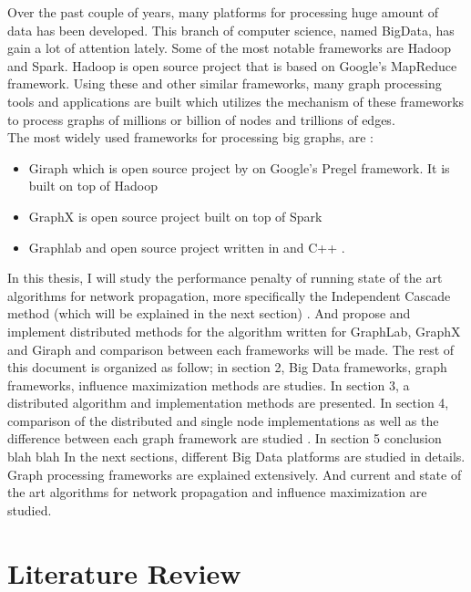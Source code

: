 \documentclass[english]{tktltiki}
\begin{document}
Over the past couple of years, many platforms for processing huge amount of data has been developed. This branch of computer science, named BigData, has gain a lot of attention lately. Some of the most notable frameworks are Hadoop and Spark. Hadoop is open source project that is based on Google's MapReduce framework. 
Using these and other similar frameworks, many graph processing tools and applications are built which utilizes the mechanism of these frameworks to process graphs of millions or billion of nodes and trillions of edges. \\
The most widely used frameworks for processing big graphs, are :
\begin{itemize}
\item 
Giraph which is open source project by on Google's Pregel framework. It is built on top of Hadoop
\item 
GraphX is open source project built on top of Spark
\item
Graphlab and open source project written in  and C++ . 
\end{itemize}
In this thesis, I will study the performance penalty of running state of the art algorithms for network propagation, more specifically the Independent Cascade method (which will be explained in the next section) . And propose and implement distributed methods for the algorithm written for GraphLab, GraphX and Giraph and comparison between each frameworks will be made. 
The rest of this document is organized as follow; in section 2, Big Data frameworks, graph frameworks, influence maximization methods are studies. In section 3, a distributed algorithm and implementation methods are presented. In section 4, comparison of the distributed and single node implementations as well as the difference between each graph framework are studied . In section 5 conclusion blah blah
In the next sections, different Big Data platforms are studied in details. Graph processing frameworks are explained extensively. And current and state of the art algorithms for network propagation and influence maximization are studied. 




\section{Literature Review}
\end{document}
